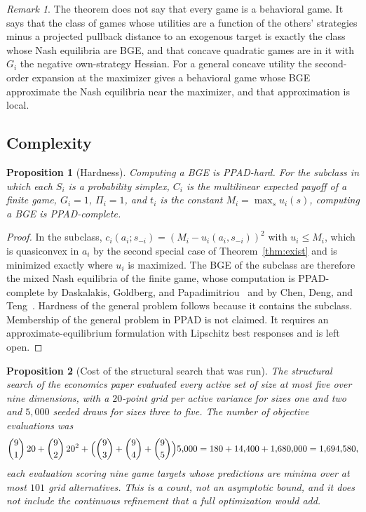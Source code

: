 \documentclass[11pt]{article}
\newtheorem{proposition}{Proposition}
\theoremstyle{definition}
\theoremstyle{remark}
\newtheorem*{remark}{Remark}
\begin{document}
\begin{remark}
The theorem does not say that every game is a behavioral game.
It says that the class of games whose utilities are a function of the others' strategies minus a projected pullback distance to an exogenous target is exactly the class whose Nash equilibria are BGE, and that concave quadratic games are in it with $G_{i}$ the negative own-strategy Hessian.
For a general concave utility the second-order expansion at the maximizer gives a behavioral game whose BGE approximate the Nash equilibria near the maximizer, and that approximation is local.
\end{remark}

\subsection{Complexity}

\begin{proposition}[Hardness]
\label{prop:hard}
Computing a BGE is PPAD-hard. For the subclass in which each $S_{i}$ is a probability simplex, $C_{i}$ is the multilinear expected payoff of a finite game, $G_{i}=1$, $\Pi_{i}=1$, and $t_{i}$ is the constant $M_{i}=\max_{s}u_{i}(s)$, computing a BGE is PPAD-complete.
\end{proposition}

\begin{proof}
In the subclass, $c_{i}(a_{i};s_{-i})=(M_{i}-u_{i}(a_{i},s_{-i}))^{2}$ with $u_{i}\le M_{i}$, which is quasiconvex in $a_{i}$ by the second special case of Theorem~\ref{thm:exist} and is minimized exactly where $u_{i}$ is maximized.
The BGE of the subclass are therefore the mixed Nash equilibria of the finite game, whose computation is PPAD-complete by Daskalakis, Goldberg, and Papadimitriou~\cite{daskalakis2009} and by Chen, Deng, and Teng~\cite{chen2009}.
Hardness of the general problem follows because it contains the subclass.
Membership of the general problem in PPAD is not claimed. It requires an approximate-equilibrium formulation with Lipschitz best responses and is left open.
\end{proof}

\begin{proposition}[Cost of the structural search that was run]
\label{prop:search}
The structural search of the economics paper evaluated every active set of size at most five over nine dimensions, with a $20$-point grid per active variance for sizes one and two and $5{,}000$ seeded draws for sizes three to five. The number of objective evaluations was
\[
\binom91\,20+\binom92\,20^{2}+\Bigl(\binom93+\binom94+\binom95\Bigr)5{,}000
=180+14{,}400+1{,}680{,}000=1{,}694{,}580,
\]
each evaluation scoring nine game targets whose predictions are minima over at most $101$ grid alternatives.
This is a count, not an asymptotic bound, and it does not include the continuous refinement that a full optimization would add.
\end{proposition}
\end{document}
